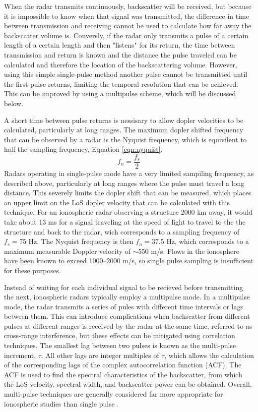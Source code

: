 When the radar transmits continuously, backscatter will be received, but because it is impossible to know when that signal was transmitted, the difference in time between transmission and receiving cannot be used to calculate how far away the backscatter volume is.  Conversly, if the radar only transmits a pulse of a certain length of a certain length and then "listens" for its return, the time between transmission and return is known and the distance the pulse traveled can be calculated and therefore the location of the backscattering volume.  However, using this simple single-pulse method another pulse cannot be transmitted until the first pulse returns, limiting the temporal resolution that can be achieved.  This can be improved by using a multipulse scheme, which will be discussed below.

A short time between pulse returns is nessisary to allow dopler velocities to be calculated, particularly at long ranges.  The maximum dopler shifted frequency that can be observed by a radar is the Nyquist frequency, which is equivilent to half the sampling frequency, Equation \ref{eqn:nyquist}.
\begin{equation}	
	\label{eqn:nyquist}
	f_n = \frac{f_s}{2}
\end{equation}
Radars operating in single-pulse mode have a very limited sampiling frequency, as described above, particularly at long ranges where the pulse must travel a long distance.  This severely limits the dopler shift that can be measured, which places an upper limit on the LoS dopler velocity that can be calculated with this technique.  For an ionospheric radar observing a structure 2000 km away, it would take about 13 ms for a signal traveling at the speed of light to travel to the the structure and back to the radar, wich corresponds to a sampling frequency of \(f_s = 75\) Hz.  The Nyquist frequency is then \(f_n = 37.5\) Hz, which corresponds to a maximum measurable Doppler velocity of \(\sim550\) m/s.  Flows in the ionosphere have been known to exceed 1000--2000 m/s, so single pulse sampling is insufficient for these purposes.

Instead of waiting for each individual signal to be recieved before transmitting the next, ionospheric radars typically employ a multipulse mode. In a multipulse mode, the radar transmits a series of pules with different time intervals or lags between them.  This can introduce complications when backscatter from different pulses at different ranges is received by the radar at the same time, referred to as cross-range interference, but these effects can be mitigated using correlation techniques.  The smallest lag between two pulses is known as the multi-pulse increment, \(\tau\).  All other lags are integer multiples of \(\tau\), which allows the calculation of the corresponding lags of the complex autocorrelation function (ACF).  The ACF is used to find the spectral characteristics of the backscatter, from which the LoS velocity, spectral width, and backscatter power can be obtained.  Overall, multi-pulse techniques are generally considered far more appropriate for ionospheric studies than single pulse \citep{Farley1972,Greenwald1983,Greenwald1985,Barthes1998,Ponomarenko2006}.

